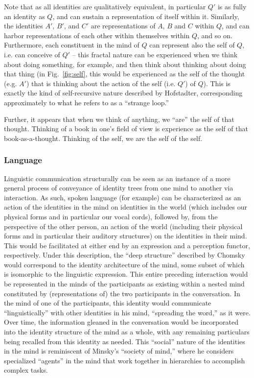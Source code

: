 \documentclass[pra,twocolumn,groupedaddress,10pt]{revtex4}
\theoremstyle{definition}
\begin{document}
Note that as all identities are qualitatively equivalent, in particular $Q'$ is as fully an identity as $Q$, and can sustain a representation of itself within it. Similarly, the identities $A'$, $B'$, and $C'$ are representations of $A$, $B$ and $C$ within $Q$, and can harbor representations of each other within themselves within $Q$, and so on. Furthermore, each constituent in the mind of $Q$ can represent also the self of $Q$, i.e. can conceive of $Q'$ -- this fractal nature can be experienced when we think about doing something, for example, and then think about thinking about doing that thing (in Fig.~\ref{fig:self}, this would be experienced as the self of the thought (e.g. $A'$) that is thinking about the action of the self (i.e. $Q'$) of $Q$). This is exactly the kind of self-recursive nature described by Hofstadter\cite{geb}, corresponding approximately to what he refers to as a ``strange loop.''

Further, it appears that when we think of anything, we ``are'' the self of that thought. Thinking of a book in one's field of view is experience as the self of that book-as-a-thought. Thinking of the self, we are the self of the self.

\subsubsection{Language} \label{sec:language}

Linguistic communication structurally can be seen as an instance of a more general process of conveyance of identity trees from one mind to another via interaction. As such, spoken language (for example) can be characterized as an action of the identities in the mind on identities in the world (which includes our physical forms and in particular our vocal cords), followed by, from the perspective of the other person, an action of the world (including their physical forms and in particular their auditory structures) on the identities in their mind. This would be facilitated at either end by an expression and a perception functor, respectively. Under this description, the ``deep structure'' described by Chomsky\cite{chomsky} would correspond to the identity architecture of the mind, some subset of which is isomorphic to the linguistic expression. This entire preceding interaction would be represented in the minds of the participants as existing within a nested mind constituted by (representations of) the two participants in the conversation. In the mind of one of the participants, this identity would communicate ``linguistically'' with other identities in his mind, ``spreading the word,'' as it were. Over time, the information gleaned in the conversation would be incorporated into the identity structure of the mind as a whole, with any remaining particulars being recalled from this identity as needed. This ``social'' nature of the identities in the mind is reminiscent of Minsky's ``society of mind,''\cite{minsky} where he considers specialized ``agents'' in the mind that work together in hierarchies to accomplish complex tasks.
\end{document}
